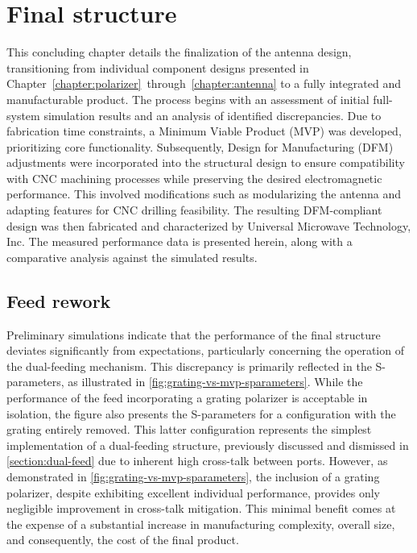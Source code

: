 \documentclass[11pt,a4paper,twoside,openany]{report}
\begin{document}
\chapter{Final structure}
\label{chapter:final-structure}
This concluding chapter details the finalization of the antenna design, transitioning from individual component designs presented in Chapter~\ref{chapter:polarizer}~through~\ref{chapter:antenna} to a fully integrated and manufacturable product. The process begins with an assessment of initial full-system simulation results and an analysis of identified discrepancies. Due to fabrication time constraints, a Minimum Viable Product (MVP) was developed, prioritizing core functionality. Subsequently, Design for Manufacturing (DFM) adjustments were incorporated into the structural design to ensure compatibility with CNC machining processes while preserving the desired electromagnetic performance. This involved modifications such as modularizing the antenna and adapting features for CNC drilling feasibility. The resulting DFM-compliant design was then fabricated and characterized by Universal Microwave Technology, Inc. The measured performance data is presented herein, along with a comparative analysis against the simulated results.

\section{Feed rework}
Preliminary simulations indicate that the performance of the final structure deviates significantly from expectations, particularly concerning the operation of the dual-feeding mechanism. This discrepancy is primarily reflected in the S-parameters, as illustrated in \cref{fig:grating-vs-mvp-sparameters}. While the performance of the feed incorporating a grating polarizer is acceptable in isolation, the figure also presents the S-parameters for a configuration with the grating entirely removed. This latter configuration represents the simplest implementation of a dual-feeding structure, previously discussed and dismissed in \cref{section:dual-feed} due to inherent high cross-talk between ports. However, as demonstrated in \cref{fig:grating-vs-mvp-sparameters}, the inclusion of a grating polarizer, despite exhibiting excellent individual performance, provides only negligible improvement in cross-talk mitigation. This minimal benefit comes at the expense of a substantial increase in manufacturing complexity, overall size, and consequently, the cost of the final product.
\end{document}
